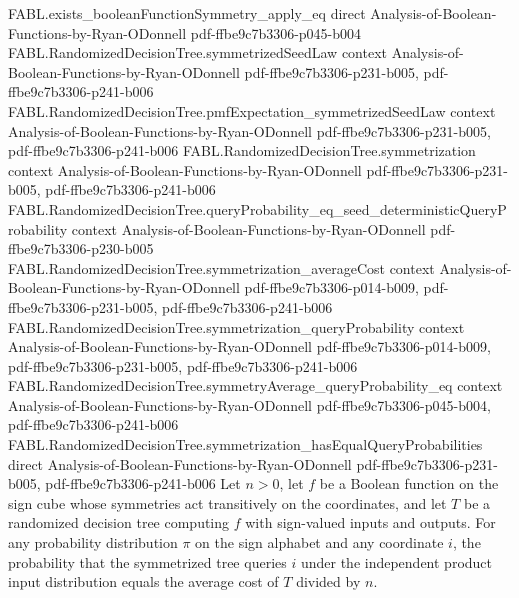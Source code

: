 \begin{theorem}
\proofstep
  {FABL.exists_booleanFunctionSymmetry_apply_eq}
  {direct}
  {Analysis-of-Boolean-Functions-by-Ryan-ODonnell}
  {pdf-ffbe9c7b3306-p045-b004}
\proofstep
  {FABL.RandomizedDecisionTree.symmetrizedSeedLaw}
  {context}
  {Analysis-of-Boolean-Functions-by-Ryan-ODonnell}
  {pdf-ffbe9c7b3306-p231-b005,
    pdf-ffbe9c7b3306-p241-b006}
\proofstep
  {FABL.RandomizedDecisionTree.pmfExpectation_symmetrizedSeedLaw}
  {context}
  {Analysis-of-Boolean-Functions-by-Ryan-ODonnell}
  {pdf-ffbe9c7b3306-p231-b005,
    pdf-ffbe9c7b3306-p241-b006}
\proofstep
  {FABL.RandomizedDecisionTree.symmetrization}
  {context}
  {Analysis-of-Boolean-Functions-by-Ryan-ODonnell}
  {pdf-ffbe9c7b3306-p231-b005,
    pdf-ffbe9c7b3306-p241-b006}
\proofstep
  {FABL.RandomizedDecisionTree.queryProbability_eq_seed_deterministicQueryProbability}
  {context}
  {Analysis-of-Boolean-Functions-by-Ryan-ODonnell}
  {pdf-ffbe9c7b3306-p230-b005}
\proofstep
  {FABL.RandomizedDecisionTree.symmetrization_averageCost}
  {context}
  {Analysis-of-Boolean-Functions-by-Ryan-ODonnell}
  {pdf-ffbe9c7b3306-p014-b009,
    pdf-ffbe9c7b3306-p231-b005,
    pdf-ffbe9c7b3306-p241-b006}
\proofstep
  {FABL.RandomizedDecisionTree.symmetrization_queryProbability}
  {context}
  {Analysis-of-Boolean-Functions-by-Ryan-ODonnell}
  {pdf-ffbe9c7b3306-p014-b009,
    pdf-ffbe9c7b3306-p231-b005,
    pdf-ffbe9c7b3306-p241-b006}
\proofstep
  {FABL.RandomizedDecisionTree.symmetryAverage_queryProbability_eq}
  {context}
  {Analysis-of-Boolean-Functions-by-Ryan-ODonnell}
  {pdf-ffbe9c7b3306-p045-b004,
    pdf-ffbe9c7b3306-p241-b006}
\proofstep
  {FABL.RandomizedDecisionTree.symmetrization_hasEqualQueryProbabilities}
  {direct}
  {Analysis-of-Boolean-Functions-by-Ryan-ODonnell}
  {pdf-ffbe9c7b3306-p231-b005,
    pdf-ffbe9c7b3306-p241-b006}
Let $n>0$, let $f$ be a Boolean function on the sign cube whose symmetries act
transitively on the coordinates, and let $T$ be a randomized decision tree computing $f$
with sign-valued inputs and outputs. For any probability distribution $\pi$ on the sign
alphabet and any coordinate $i$, the probability that the symmetrized tree queries $i$
under the independent product input distribution equals the average cost of $T$ divided
by $n$.
\end{theorem}


